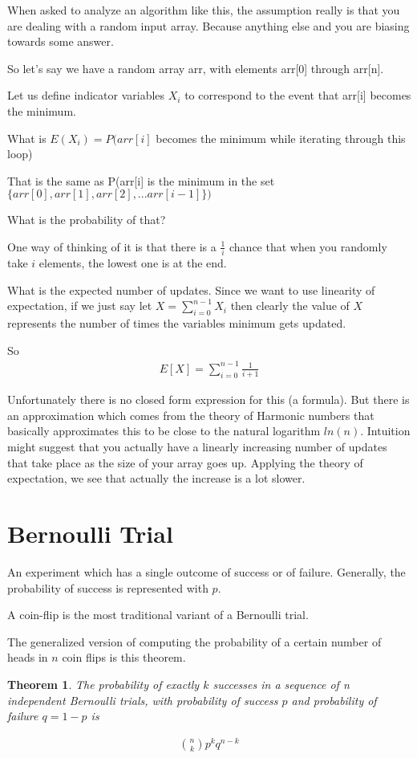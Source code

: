 \documentclass[12pt]{article}
\newtheorem{theorem}{Theorem}
\begin{document}
When asked to analyze an algorithm like this, the assumption really is that you are dealing with a random input array. Because anything else and you are biasing towards some answer.

So let's say we have a random array arr, with elements arr[0] through arr[n].

Let us define indicator variables $X_i$ to correspond to the event that arr[i] becomes the minimum. 

What is $E(X_i) = P(arr[i]$ becomes the minimum while iterating through this loop)

That is the same as P(arr[i] is the minimum in the set 
$\{arr[0], arr[1], arr[2],...arr[i-1]\})$
 
What is the probability of that? 

One way of thinking of it is that there is a $\frac{1}{i}$ chance that when you randomly take $i$ elements, the lowest one is at the end. 

What is the expected number of updates. Since we want to use linearity of expectation, if we 
just say let $\displaystyle X = \sum_{i=0}^{n-1}X_i$ then clearly the value of $X$ represents the number of times the variables minimum gets updated.

So
\begin{align*}
E[X] = \sum_{i=0}^{n-1} \frac{1}{i+1} 
\end{align*} 

Unfortunately there is no closed form expression for this (a formula). But there is an approximation which comes from the theory of Harmonic numbers that basically approximates this to be close to the natural logarithm $ln(n)$. Intuition might suggest that you actually have a linearly increasing number of updates that take place as the size of your array goes up. Applying the theory of expectation, we see that actually the increase is a lot slower.

\section*{Bernoulli Trial}
An experiment which has a single outcome of success or of failure. Generally, the probability of success is represented with $p$. 

A coin-flip is the most traditional variant of a Bernoulli trial.

The generalized version of computing the probability of a certain number of heads in $n$ coin flips is this theorem.

\begin{theorem}
The probability of exactly $k$ successes in a sequence of n independent Bernoulli trials, with probability of success $p$ and probability of failure $q = 1-p$ is

\begin{align*}
\binom{n}{k}p^kq^{n-k}
\end{align*}

\end{theorem}
\end{document}
